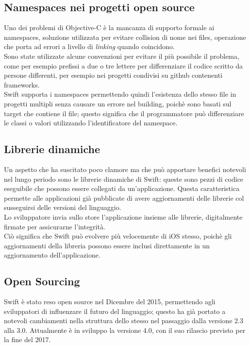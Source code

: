 \subsection{Namespaces nei progetti open source}
Uno dei problemi di Objective-C è la mancanza di supporto formale ai namespaces, soluzione utilizzata per evitare collision di nome nei files, operazione che porta ad errori a livello di \textit{linking} quando coincidono.\\Sono state utilizzate alcune convenzioni per evitare il più possibile il problema, come per esempio prefissi a due o tre lettere per differenziare il codice scritto da persone differenti, per esempio nei progetti condivisi su github contenenti frameworks.\\
Swift supporta i namespaces permettendo quindi l'esistenza dello stesso file in progetti multipli senza causare un errore nel building, poichè sono basati sul target che contiene il file; questo significa che il programmatore può differenziare le classi o valori utilizzando l'identificatore del namespace.\\
\subsection{Librerie dinamiche}
Un aspetto che ha suscitato poco clamore ma che può apportare benefici notevoli nel lungo periodo sono le librerie dinamiche di Swift: queste sono pezzi di codice eseguibile che possono essere collegati da un'applicazione. Questa caratteristica permette alle applicazioni già pubblicate di avere aggiornamenti delle librerie col susseguirsi delle versioni del linguaggio.\\Lo sviluppatore invia sullo store l'applicazione insieme alle librerie, digitalmente firmate per assicurarne l'integrità.\\Ciò significa che Swift può evolvere più velocemente di iOS stesso, poichè gli aggiornamenti della libreria possono essere inclusi direttamente in un aggiornamento dell'applicazione.\\
\subsection{Open Sourcing}
Swift è stato reso open source nel Dicembre del 2015, permettendo agli sviluppatori di influenzare il futuro del linguaggio; questo ha già portato a notevoli cambiamenti nella struttura dello stesso nel passaggio dalla versione 2.3 alla 3.0. Attualmente è in sviluppo la versione 4.0, con il suo rilascio previsto per la fine del 2017. 
